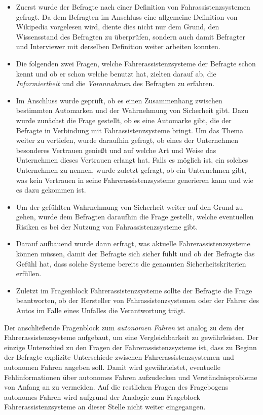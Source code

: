 \documentclass[12pt]{article}
\begin{document}
\begin{itemize}
  \item Zuerst wurde der Befragte nach einer Definition von Fahrassistenzsystemen gefragt. Da dem Befragten im Anschluss eine allgemeine Definition von Wikipedia vorgelesen wird, diente dies nicht nur dem Grund, den Wissensstand des Befragten zu überprüfen, sondern auch damit Befragter und Interviewer mit derselben Definition weiter arbeiten konnten.

  \item Die folgenden zwei Fragen, welche Fahrerassistenzsysteme der Befragte schon kennt und ob er schon welche benutzt hat, zielten darauf ab, die \emph{Informiertheit} und die \emph{Vorannahmen} des Befragten zu erfahren.

  \item Im Anschluss wurde geprüft, ob es einen Zusammenhang zwischen bestimmten Automarken und der Wahrnehmung von Sicherheit gibt. Dazu wurde zunächst die Frage gestellt, ob es eine Automarke gibt, die der Befragte in Verbindung mit Fahrassistenzsysteme bringt. Um das Thema weiter zu vertiefen, wurde daraufhin gefragt, ob eines der Unternehmen besonderes Vertrauen genießt und auf welche Art und Weise das Unternehmen dieses Vertrauen erlangt hat. Falls es möglich ist, ein solches Unternehmen zu nennen, wurde zuletzt gefragt, ob ein Unternehmen gibt, was kein Vertrauen in seine Fahrerassistenzsysteme generieren kann und wie es dazu gekommen ist.

  \item Um der gefühlten Wahrnehmung von Sicherheit weiter auf den Grund zu gehen, wurde dem Befragten daraufhin die Frage gestellt, welche eventuellen Risiken es bei der Nutzung von Fahrassistenzsysteme gibt.

  \item Darauf aufbauend wurde dann erfragt, was aktuelle Fahrerassistenzsysteme können müssen, damit der Befragte sich sicher fühlt und ob der Befragte das Gefühl hat, dass solche Systeme bereits die genannten Sicherheitskriterien erfüllen.

  \item Zuletzt im Fragenblock Fahrerassistenzsysteme sollte der Befragte die Frage beantworten, ob der Hersteller von Fahrassistenzsystemen oder der Fahrer des Autos im Falle eines Unfalles die Verantwortung trägt.
\end{itemize}

Der anschließende Fragenblock zum \emph{autonomen Fahren} ist analog zu dem der Fahrerassistenzsysteme aufgebaut, um eine Vergleichbarkeit zu gewährleisten. Der einzige Unterschied zu den Fragen der Fahrerassistenzsysteme ist, dass zu Beginn der Befragte explizite Unterschiede zwischen Fahrerassistenzsystemen und autonomen Fahren angeben soll. Damit wird gewährleistet, eventuelle Fehlinformationen über autonomes Fahren aufzudecken und Verständnisprobleme von Anfang an zu vermeiden. Auf die restlichen Fragen des Fragebogens autonomes Fahren wird aufgrund der Analogie zum Frageblock Fahrerassistenzsysteme an dieser Stelle nicht weiter eingegangen.
\end{document}
